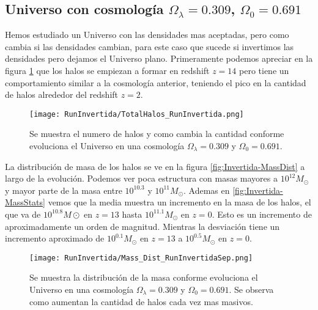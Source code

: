 \subsection{Universo con cosmología  \texorpdfstring{$\Omega_\lambda = 0.309$, $\Omega_0 = 0.691$ }{Omega lambda = 0.309, Omega 0 = 0.691} }
Hemos estudiado un Universo con las densidades mas aceptadas, pero como cambia si las densidades cambian, para este caso que sucede si invertimos las densidades pero dejamos el Universo plano. Primeramente podemos apreciar en la figura \ref{fig:Invertida-TotalHalos} que los halos se empiezan a formar en redshift $z=14$ pero tiene un comportamiento similar a la cosmología anterior, teniendo el pico en la cantidad de halos alrededor del redshift $z=2$. 

\begin{figure}[H]
    \centering
    \texttt{[image: RunInvertida/TotalHalos\_RunInvertida.png]}
    \caption[Evolución del número de halos en un Universo $\Omega_\lambda = 0.309 $, $\Omega_0 = 0.691$]{\footnotesize Se muestra el numero de halos y como cambia la cantidad conforme evoluciona el Universo en una cosmología $\Omega_\lambda = 0.309 $ y $\Omega_0 = 0.691$.}    
    \label{fig:Invertida-TotalHalos}
\end{figure}

La distribución de masa de los halos se ve en la figura \ref{fig:Invertida-MassDist} a largo de la evolución. Podemos ver poca estructura con masas mayores a $10^{12}M_\odot$ y mayor parte de la masa entre $10^{10.3}$ y $10^{11}M_\odot$. Ademas en  \ref{fig:Invertida-MassStats} vemos que la media muestra un incremento en la masa de los halos, el que va de $10^{10.8} M\odot$ en $z=13$ hasta $10^{11.1}M_\odot$ en $z=0$. Esto es un incremento de aproximadamente un orden de magnitud. Mientras la desviación tiene un incremento aproximado de $10^{0.1}M_\odot$ en $z=13$ a $10^{0.5}M_\odot$ en $z=0$. 

\begin{figure}[H]
    \centering
    \texttt{[image: RunInvertida/Mass\_Dist\_RunInvertidaSep.png]}
    \caption[Distribución de masa en la evolución de un Universo $\Omega_\lambda = 0.309 $, $\Omega_0 = 0.691$]{\footnotesize Se muestra la distribución de la masa conforme evoluciona el Universo en una cosmología $\Omega_\lambda = 0.309 $ y $\Omega_0 = 0.691$. Se observa como aumentan la cantidad de halos cada vez mas masivos.}
    \label{fig:Invertida-MassDistSep}
\end{figure}


